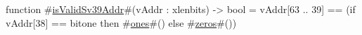 function #\hyperref[sailRISCVzisValidSv39Addr]{isValidSv39Addr}#(vAddr : xlenbits) -> bool = {
  vAddr[63 .. 39] == (if   vAddr[38] == bitone
                      then #\hyperref[sailRISCVzones]{ones}#()
                      else #\hyperref[sailRISCVzzzeros]{zeros}#())
}
